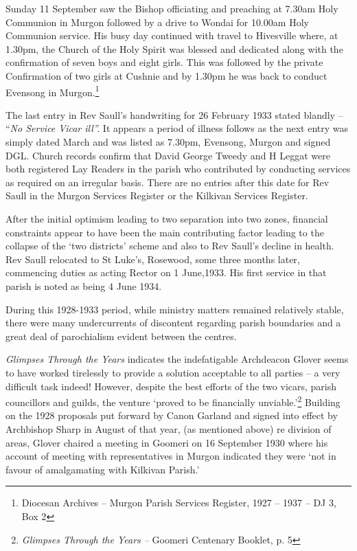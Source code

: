 Sunday 11 September saw the Bishop officiating and preaching at 7.30am
Holy Communion in Murgon followed by a drive to Wondai for 10.00am Holy
Communion service. His busy day continued with travel to Hivesville
where, at 1.30pm, the Church of the Holy Spirit was blessed and
dedicated along with the confirmation of seven boys and eight girls.
This was followed by the private Confirmation of two girls at Cushnie
and by 1.30pm he was back to conduct Evensong in Murgon.\footnote{Diocesan
  Archives -- Murgon Parish Services Register, 1927 -- 1937 -- DJ 3, Box
  2}

The last entry in Rev Saull's handwriting for 26 February 1933 stated
blandly -- ``\emph{No Service Vicar ill''.} It appears a period of
illness follows as the next entry was simply dated March and was listed
as 7.30pm, Evensong, Murgon and signed DGL. Church records confirm that
David George Tweedy and H Leggat were both registered Lay Readers in the
parish who contributed by conducting services as required on an
irregular basis. There are no entries after this date for Rev Saull in
the Murgon Services Register or the Kilkivan Services Register.

After the initial optimism leading to two separation into two zones,
financial constraints appear to have been the main contributing factor
leading to the collapse of the `two districts' scheme and also to Rev
Saull's decline in health. Rev Saull relocated to St Luke's, Rosewood,
some three months later, commencing duties as acting Rector on 1
June,1933. His first service in that parish is noted as being 4 June
1934.

During this 1928-1933 period, while ministry matters remained relatively
stable, there were many undercurrents of discontent regarding parish
boundaries and a great deal of parochialism evident between the centres.

\emph{Glimpses Through the Years} indicates the indefatigable Archdeacon
Glover seems to have worked tirelessly to provide a solution acceptable
to all parties -- a very difficult task indeed! However, despite the
best efforts of the two vicars, parish councillors and guilds, the
venture `proved to be financially unviable.'\footnote{\emph{Glimpses
  Through the Years --} Goomeri Centenary Booklet, p. 5} Building on the
1928 proposals put forward by Canon Garland and signed into effect by
Archbishop Sharp in August of that year, (as mentioned above) re
division of areas, Glover chaired a meeting in Goomeri on 16 September
1930 where his account of meeting with representatives in Murgon
indicated they were `not in favour of amalgamating with Kilkivan
Parish.'

